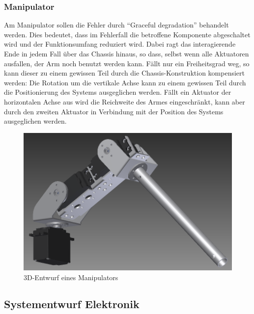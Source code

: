 \subsubsection{Manipulator}
\label{kap:Manipulator}
Am Manipulator sollen die Fehler durch “Graceful degradation” behandelt werden.
Dies bedeutet, dass im Fehlerfall die betroffene Komponente abgeschaltet wird und der Funktionsumfang reduziert wird. Dabei ragt das interagierende Ende in jedem Fall über das Chassis hinaus, so dass, selbst wenn alle Aktuatoren ausfallen, der Arm noch benutzt werden kann.
Fällt nur ein Freiheitsgrad weg, so kann dieser zu einem gewissen Teil durch die Chassis-Konstruktion kompensiert werden:
Die Rotation um die vertikale Achse kann zu einem gewissen Teil durch die Positionierung des Systems ausgeglichen werden.
Fällt ein Aktuator der horizontalen Achse aus wird die Reichweite des Armes eingeschränkt, kann aber durch den zweiten Aktuator in Verbindung mit der Position des Systems ausgeglichen werden.
\begin{figure}[H]
\centering
\includegraphics[width=0.5\linewidth]{Bilder/FaTNet_manipulator}
\caption{3D-Entwurf eines Manipulators}
\end{figure}

\subsection{Systementwurf Elektronik}
\label{SystementwurfElektronik}

